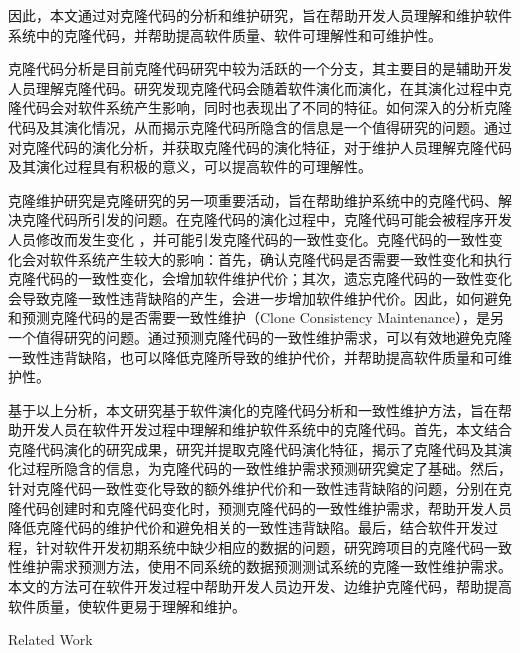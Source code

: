 因此，本文通过对克隆代码的分析和维护研究，旨在帮助开发人员理解和维护软件系统中的克隆代码，并帮助提高软件质量、软件可理解性和可维护性。

克隆代码分析是目前克隆代码研究中较为活跃的一个分支，其主要目的是辅助开发人员理解克隆代码。研究发现克隆代码会随着软件演化而演化\cite{kim2005empirical}\cite{saha2011automatic}，在其演化过程中克隆代码会对软件系统产生影响，同时也表现出了不同的特征\cite{gode2011frequency}\cite{mondal2012dispersion}\cite{rahman2014change}。如何深入的分析克隆代码及其演化情况，从而揭示克隆代码所隐含的信息是一个值得研究的问题。通过对克隆代码的演化分析，并获取克隆代码的演化特征，对于维护人员理解克隆代码及其演化过程具有积极的意义，可以提高软件的可理解性。

克隆维护研究是克隆研究的另一项重要活动，旨在帮助维护系统中的克隆代码、解决克隆代码所引发的问题。在克隆代码的演化过程中，克隆代码可能会被程序开发人员修改而发生变化 ，并可能引发克隆代码的一致性变化\cite{krinke2007study}\cite{aversano2007clones}。克隆代码的一致性变化会对软件系统产生较大的影响：首先，确认克隆代码是否需要一致性变化和执行克隆代码的一致性变化，会增加软件维护代价；其次，遗忘克隆代码的一致性变化会导致克隆一致性违背缺陷的产生\cite{juergens2009code}\cite{wagner2016relationship}，会进一步增加软件维护代价。因此，如何避免和预测克隆代码的是否需要一致性维护（Clone Consistency Maintenance），是另一个值得研究的问题。通过预测克隆代码的一致性维护需求，可以有效地避免克隆一致性违背缺陷，也可以降低克隆所导致的维护代价，并帮助提高软件质量和可维护性。

基于以上分析，本文研究基于软件演化的克隆代码分析和一致性维护方法，旨在帮助开发人员在软件开发过程中理解和维护软件系统中的克隆代码。首先，本文结合克隆代码演化的研究成果，研究并提取克隆代码演化特征，揭示了克隆代码及其演化过程所隐含的信息，为克隆代码的一致性维护需求预测研究奠定了基础。然后，针对克隆代码一致性变化导致的额外维护代价和一致性违背缺陷的问题，分别在克隆代码创建时和克隆代码变化时，预测克隆代码的一致性维护需求，帮助开发人员降低克隆代码的维护代价和避免相关的一致性违背缺陷。最后，结合软件开发过程，针对软件开发初期系统中缺少相应的数据的问题，研究跨项目的克隆代码一致性维护需求预测方法，使用不同系统的数据预测测试系统的克隆一致性维护需求。本文的方法可在软件开发过程中帮助开发人员边开发、边维护克隆代码，帮助提高软件质量，使软件更易于理解和维护。


{Related Work}

